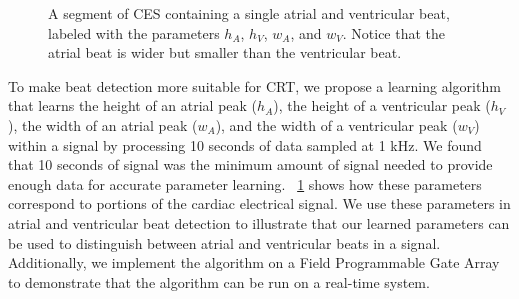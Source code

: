 \documentclass[conference]{IEEEtran}
\newcommand{\APW}{\ensuremath{w_A}}
\newcommand{\VPW}{\ensuremath{w_V}}
\newcommand{\APH}{\ensuremath{h_A}}
\newcommand{\VPH}{\ensuremath{h_V}}
\begin{document}
\begin{figure}
	\centering
	\caption{
	A segment of CES containing a single atrial and ventricular beat, labeled with the parameters \APH, \VPH, \APW, and \VPW. 
	Notice that the atrial beat is wider but smaller than the ventricular beat.}
	\label{fig:singlebeat}
\end{figure}
To make beat detection more suitable for CRT,
we propose a learning algorithm that learns the
height of an atrial peak (\APH), the height of a ventricular
peak (\VPH), the width of an atrial peak (\APW), and the
width of a ventricular peak (\VPW) within a signal 
by processing 10 seconds of data sampled
at 1 kHz.  We found that 10 seconds of signal was the minimum amount of signal 
needed to provide enough data for accurate parameter learning.
\figurename~\ref{fig:singlebeat} shows how these parameters correspond to portions of the cardiac electrical signal.
We use these parameters in atrial and ventricular beat detection to illustrate that our learned parameters can be used to distinguish between atrial and ventricular beats in a signal. 
Additionally, we implement the algorithm on a Field
Programmable Gate Array to demonstrate that the
algorithm can be run on a real-time system.
\end{document}
